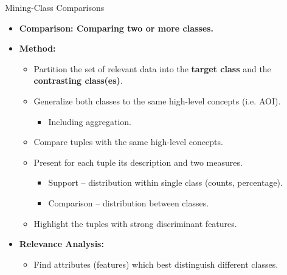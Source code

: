 \begin{frame}{Mining-Class Comparisons}
	\begin{itemize}
		\item \textbf{Comparison: Comparing two or more classes.}
		\item \textbf{Method:}
		      \begin{itemize}
			      \item Partition the set of relevant data into the \textbf{\color{airforceblue}target class} and the \textbf{\color{airforceblue}contrasting class(es)}.
			      \item Generalize both classes to the same high-level concepts (i.e. AOI).
			            \begin{itemize}
				            \item Including aggregation.
			            \end{itemize}
			      \item Compare tuples with the same high-level concepts.
			      \item Present for each tuple its description and two measures.
			            \begin{itemize}
				            \item Support -- distribution within single class (counts, percentage).
				            \item Comparison -- distribution between classes.
			            \end{itemize}
			      \item Highlight the tuples with strong discriminant features.
		      \end{itemize}
		\item \textbf{Relevance Analysis:}
		      \begin{itemize}
			      \item Find attributes (features) which best distinguish different classes.
		      \end{itemize}
	\end{itemize}
\end{frame}

